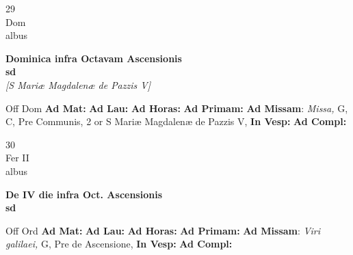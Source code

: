 \documentclass[10pt, openany]{book}
\begin{document}
        \begin{center}
            \begin{minipage}{3.5in}
                \vspace{2em}
                \begin{minipage}{0.5in}
                    {\Huge 29} \\
                    {\normalsize Dom} \\
                    {\normalsize albus}
                \end{minipage}
                \begin{minipage}{3.0in}
                    \textbf{ \large Dominica infra Octavam Ascensionis \\
                    \textnormal{\normalsize sd}} \\ \textit{[S Mariæ Magdalenæ de Pazzis V]} \\ 
                \end{minipage}
                \begin{justify}Off Dom
                    \textbf{Ad Mat: }
                    \textbf{Ad Lau: }
                    \textbf{Ad Horas: }
                    \textbf{Ad Primam: }\textbf{Ad Missam}: \textit{Missa,} G, C, Pre Communis, 2 or S Mariæ Magdalenæ de Pazzis V,  
                    \textbf{In Vesp: }
                    \textbf{Ad Compl: }
                \end{justify}
            \end{minipage}
        \end{center}
    
        \begin{center}
            \begin{minipage}{3.5in}
                \vspace{2em}
                \begin{minipage}{0.5in}
                    {\Huge 30} \\
                    {\normalsize Fer II} \\
                    {\normalsize albus}
                \end{minipage}
                \begin{minipage}{3.0in}
                    \textbf{ \large De IV die infra Oct. Ascensionis \\
                    \textnormal{\normalsize sd}} \\ 
                \end{minipage}
                \begin{justify}Off Ord
                    \textbf{Ad Mat: }
                    \textbf{Ad Lau: }
                    \textbf{Ad Horas: }
                    \textbf{Ad Primam: }\textbf{Ad Missam}: \textit{Viri galilaei,} G, Pre de Ascensione,  
                    \textbf{In Vesp: }
                    \textbf{Ad Compl: }
                \end{justify}
            \end{minipage}
        \end{center}
    
\end{document}
